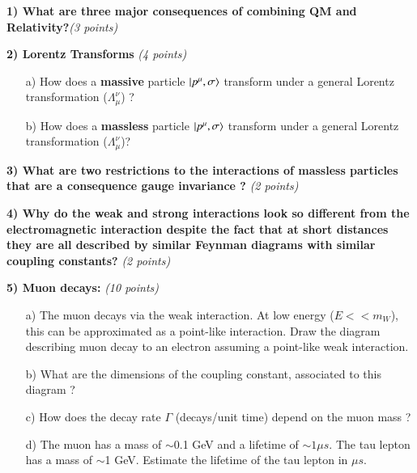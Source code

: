 {\large



\textbf{1) What are three major consequences of combining QM and Relativity?}\hfill \textit{(3 points)}\\

\vspace{0.5in}


\textbf{2) Lorentz Transforms } \hfill \textit{(4 points)}\\
\begin{itemize}
\item[a)] How does a \textbf{massive} particle $\ket{p^\mu,\sigma}$ transform under a general Lorentz transformation ($\Lambda_\mu^\nu$) ?
\vspace*{0.2in}
\item[b)] How does a \textbf{massless} particle $\ket{p^\mu,\sigma}$ transform under a general Lorentz transformation ($\Lambda_\mu^\nu$)?
\vspace*{0.2in}
\end{itemize}



\textbf{3) What are two restrictions to the interactions of massless particles that are a consequence gauge invariance ? }\hfill \textit{(2 points)}\\

\vspace{0.5in}


\textbf{4) Why do the weak and strong interactions look so different from the electromagnetic interaction despite the fact that at short distances they are all described by similar Feynman diagrams with similar coupling constants?} \hfill \textit{(2 points)}\\

\vspace{0.5in}

\clearpage

\textbf{5) Muon decays: } \hfill \textit{(10 points)}\\
\begin{itemize}
  \item[a)]{ The muon decays via the weak interaction.  At low energy ($E << m_W$), this can be approximated as a point-like interaction. 
  Draw the diagram describing muon decay to an electron assuming a point-like weak interaction. 
  \vspace*{0.5in}
}
  \item[b)]{What are the dimensions of the coupling constant, associated to this diagram  ?
\vspace*{0.5in}
  }
  \item[c)] How does the decay rate $\Gamma$ (decays/unit time)  depend on the muon mass ? 
\vspace*{0.5in}
  \item[d)]{ The muon has a mass of $\sim$0.1 GeV and a lifetime of $\sim 1 \mu s$. The tau lepton has a mass of {$\sim$1 GeV}. Estimate the lifetime of the tau lepton in $\mu s$.
\vspace*{0.5in}
}
\end{itemize}


}
